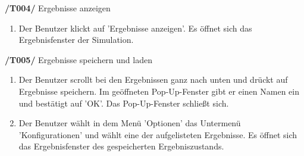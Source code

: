 \textbf{/T004/} Ergebnisse anzeigen
\begin{enumerate}
\item {}
		{Der Benutzer klickt auf 'Ergebnisse anzeigen'.}
		{Es öffnet sich das Ergebnisfenster der Simulation.}
\end{enumerate}

\textbf{/T005/} Ergebnisse speichern und laden
\begin{enumerate}
\item {}
		{Der Benutzer scrollt bei den Ergebnissen ganz nach unten und drückt auf Ergebnisse speichern. Im geöffneten Pop-Up-Fenster gibt er einen Namen ein und bestätigt auf 'OK'.}
		{Das Pop-Up-Fenster schließt sich.}

\item {}
		{Der Benutzer wählt in dem Menü 'Optionen' das Untermenü 'Konfigurationen' und wählt eine der aufgelisteten Ergebnisse.}
		{Es öffnet sich das Ergebnisfenster des gespeicherten Ergebniszustands.}
\end{enumerate}



